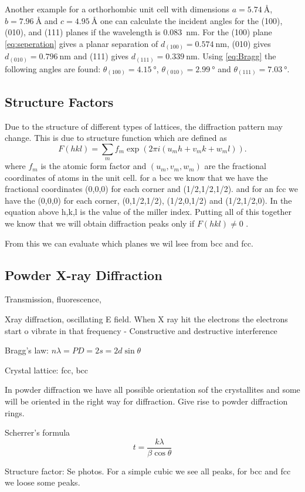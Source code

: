 Another example for a orthorhombic unit cell with dimensions $a=\SI{5.74}{\angstrom}$, $b=\SI{7.96}{\angstrom}$ and $c=\SI{4.95}{\angstrom}$ one can calculate the incident angles for the (100), (010), and
(111) planes if the  wavelength is \SI{0.083}{\nano\m}. For the (100) plane \autoref{eq:seperation} gives a planar separation of $d_{(100)}=\SI{0.574}{\nano\m}$, (010) gives $d_{(010)}=\SI{0.796}{\nano\m}$ and (111) gives $d_{(111)}=\SI{0.339}{\nano\m}$. Using \autoref{eq:Bragg} the following angles are found: $\theta_{(100)} = \SI{4.15}{\degree}$, $\theta_{(010)} = \SI{2.99}{\degree}$ and $\theta_{(111)} = \SI{7.03}{\degree}$.

\subsection{Structure Factors}
Due to the structure of different types of lattices, the diffraction pattern may change. This is due to structure function which are defined as 
\begin{equation}
    F(hkl) = \sum_{m} f_m \exp\left( 2\pi i (u_m h + v_m k + w_m l) \right). 
    \label{eq:structurefunction}
\end{equation}
where $f_m$ is the atomic form factor and $(u_m,v_m,w_m)$ are the fractional coordinates of atoms in the unit cell. for a bcc we know that we have the fractional coordinates (0,0,0) for each corner and (1/2,1/2,1/2). and for an fcc we have the (0,0,0) for each corner,  (0,1/2,1/2), (1/2,0,1/2) and (1/2,1/2,0). In the equation above h,k,l is the value of the miller index. Putting all of this together we know that we will obtain diffraction peaks only if $F(hkl)\neq0$ \cite{solidstatephysics2025}. 

From this we can evaluate which planes we wil lsee from bcc and fcc. 



\subsection{Powder X-ray Diffraction}

Transmission, fluorescence, 

Xray diffraction, oscillating E field. When X ray hit the electrons the electrons start o vibrate in that frequency
- Constructive and destructive interference 

Bragg's law: $n\lambda=PD=2s=2d\sin\theta$

Crystal lattice: fcc, bcc


In powder diffraction we have all possible orientation sof the crystallites and some will be oriented in the right way for diffraction. Give rise to powder diffraction rings. 

Scherrer's formula
\begin{equation}
    t=\frac{k\lambda}{\beta\cos\theta}
\end{equation}

Structure factor: Se photos. For a simple cubic we see all peaks, for bcc and fcc we loose some peaks. 

